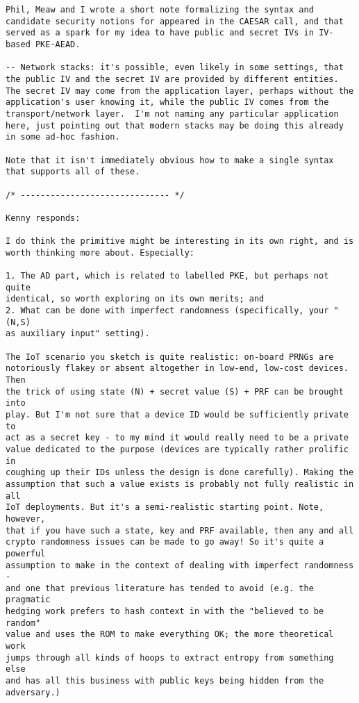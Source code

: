 \begin{lstlisting}
Phil, Meaw and I wrote a short note formalizing the syntax and candidate security notions for appeared in the CAESAR call, and that served as a spark for my idea to have public and secret IVs in IV-based PKE-AEAD.

-- Network stacks: it's possible, even likely in some settings, that the public IV and the secret IV are provided by different entities.  The secret IV may come from the application layer, perhaps without the application's user knowing it, while the public IV comes from the transport/network layer.  I'm not naming any particular application here, just pointing out that modern stacks may be doing this already in some ad-hoc fashion.

Note that it isn't immediately obvious how to make a single syntax that supports all of these. 

/* ------------------------------ */

Kenny responds:

I do think the primitive might be interesting in its own right, and is
worth thinking more about. Especially:

1. The AD part, which is related to labelled PKE, but perhaps not quite
identical, so worth exploring on its own merits; and
2. What can be done with imperfect randomness (specifically, your "(N,S)
as auxiliary input" setting).

The IoT scenario you sketch is quite realistic: on-board PRNGs are
notoriously flakey or absent altogether in low-end, low-cost devices. Then
the trick of using state (N) + secret value (S) + PRF can be brought into
play. But I'm not sure that a device ID would be sufficiently private to
act as a secret key - to my mind it would really need to be a private
value dedicated to the purpose (devices are typically rather prolific in
coughing up their IDs unless the design is done carefully). Making the
assumption that such a value exists is probably not fully realistic in all
IoT deployments. But it's a semi-realistic starting point. Note, however,
that if you have such a state, key and PRF available, then any and all
crypto randomness issues can be made to go away! So it's quite a powerful
assumption to make in the context of dealing with imperfect randomness -
and one that previous literature has tended to avoid (e.g. the pragmatic
hedging work prefers to hash context in with the "believed to be random"
value and uses the ROM to make everything OK; the more theoretical work
jumps through all kinds of hoops to extract entropy from something else
and has all this business with public keys being hidden from the
adversary.)
\end{lstlisting}
